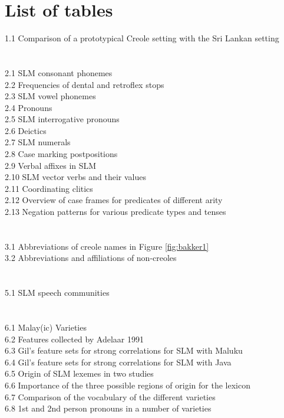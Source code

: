 \section*{List of tables}
1.1 Comparison of a prototypical Creole setting with the Sri Lankan setting\\
\\\\
2.1 SLM consonant phonemes\\
2.2 Frequencies of dental and retroflex stops\\
2.3 SLM vowel phonemes\\
2.4 Pronouns\\
2.5 SLM interrogative pronouns\\
2.6 Deictics\\
2.7 SLM numerals\\
2.8 Case marking postpositions\\
2.9 Verbal affixes in SLM\\
2.10 SLM vector verbs and their values\\
2.11 Coordinating clitics\\
2.12 Overview of case frames for predicates of different arity\\
2.13 Negation patterns for various predicate types and tenses\\
\\\\
3.1 Abbreviations of creole names in Figure \ref {fig:bakker1}\\
3.2 Abbreviations and affiliations of non-creoles\\
\\\\ 
5.1 SLM speech communities\\
\\\\
6.1 Malay(ic) Varieties\\
6.2 Features collected by Adelaar 1991\\
6.3 Gil's feature sets for strong correlations for SLM with Maluku\\
6.4 Gil's feature sets for strong correlations for SLM with Java\\
6.5 Origin of SLM lexemes in two studies\\
6.6 Importance of the three possible regions of origin for the lexicon\\
6.7 Comparison of the vocabulary of the different varieties\\
6.8 1st and 2nd person pronouns in a number of varieties\\
